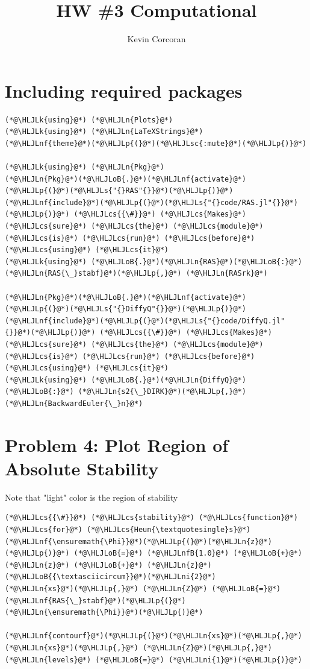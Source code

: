 \documentclass[12pt,a4paper]{article}
\title{ HW \#3 Computational }
\author{ Kevin Corcoran }
\newcommand{\HLJLk}[1]{\textcolor[RGB]{148,91,176}{\textbf{#1}}}
\newcommand{\HLJLn}[1]{#1}
\newcommand{\HLJLnf}[1]{\textcolor[RGB]{66,102,213}{#1}}
\newcommand{\HLJLs}[1]{\textcolor[RGB]{201,61,57}{#1}}
\newcommand{\HLJLsc}[1]{\textcolor[RGB]{201,61,57}{#1}}
\newcommand{\HLJLnfB}[1]{\textcolor[RGB]{59,151,46}{#1}}
\newcommand{\HLJLni}[1]{\textcolor[RGB]{59,151,46}{#1}}
\newcommand{\HLJLoB}[1]{\textcolor[RGB]{102,102,102}{\textbf{#1}}}
\newcommand{\HLJLp}[1]{#1}
\newcommand{\HLJLcs}[1]{\textcolor[RGB]{153,153,119}{\textit{#1}}}
\begin{document}
\maketitle

\section{Including required packages}

\begin{lstlisting}
(*@\HLJLk{using}@*) (*@\HLJLn{Plots}@*)
(*@\HLJLk{using}@*) (*@\HLJLn{LaTeXStrings}@*)
(*@\HLJLnf{theme}@*)(*@\HLJLp{(}@*)(*@\HLJLsc{:mute}@*)(*@\HLJLp{)}@*)

(*@\HLJLk{using}@*) (*@\HLJLn{Pkg}@*)
(*@\HLJLn{Pkg}@*)(*@\HLJLoB{.}@*)(*@\HLJLnf{activate}@*)(*@\HLJLp{(}@*)(*@\HLJLs{"{}RAS"{}}@*)(*@\HLJLp{)}@*)
(*@\HLJLnf{include}@*)(*@\HLJLp{(}@*)(*@\HLJLs{"{}code/RAS.jl"{}}@*)(*@\HLJLp{)}@*) (*@\HLJLcs{{\#}}@*) (*@\HLJLcs{Makes}@*) (*@\HLJLcs{sure}@*) (*@\HLJLcs{the}@*) (*@\HLJLcs{module}@*) (*@\HLJLcs{is}@*) (*@\HLJLcs{run}@*) (*@\HLJLcs{before}@*) (*@\HLJLcs{using}@*) (*@\HLJLcs{it}@*)
(*@\HLJLk{using}@*) (*@\HLJLoB{.}@*)(*@\HLJLn{RAS}@*)(*@\HLJLoB{:}@*) (*@\HLJLn{RAS{\_}stabf}@*)(*@\HLJLp{,}@*) (*@\HLJLn{RASrk}@*)

(*@\HLJLn{Pkg}@*)(*@\HLJLoB{.}@*)(*@\HLJLnf{activate}@*)(*@\HLJLp{(}@*)(*@\HLJLs{"{}DiffyQ"{}}@*)(*@\HLJLp{)}@*)
(*@\HLJLnf{include}@*)(*@\HLJLp{(}@*)(*@\HLJLs{"{}code/DiffyQ.jl"{}}@*)(*@\HLJLp{)}@*) (*@\HLJLcs{{\#}}@*) (*@\HLJLcs{Makes}@*) (*@\HLJLcs{sure}@*) (*@\HLJLcs{the}@*) (*@\HLJLcs{module}@*) (*@\HLJLcs{is}@*) (*@\HLJLcs{run}@*) (*@\HLJLcs{before}@*) (*@\HLJLcs{using}@*) (*@\HLJLcs{it}@*)
(*@\HLJLk{using}@*) (*@\HLJLoB{.}@*)(*@\HLJLn{DiffyQ}@*)(*@\HLJLoB{:}@*) (*@\HLJLn{s2{\_}DIRK}@*)(*@\HLJLp{,}@*) (*@\HLJLn{BackwardEuler{\_}n}@*)
\end{lstlisting}


\section{Problem 4: Plot Region of Absolute Stability}
Note that "light" color is the region of stability


\begin{lstlisting}
(*@\HLJLcs{{\#}}@*) (*@\HLJLcs{stability}@*) (*@\HLJLcs{function}@*) (*@\HLJLcs{for}@*) (*@\HLJLcs{Heun{\textquotesingle}s}@*)
(*@\HLJLnf{\ensuremath{\Phi}}@*)(*@\HLJLp{(}@*)(*@\HLJLn{z}@*)(*@\HLJLp{)}@*) (*@\HLJLoB{=}@*) (*@\HLJLnfB{1.0}@*) (*@\HLJLoB{+}@*) (*@\HLJLn{z}@*) (*@\HLJLoB{+}@*) (*@\HLJLn{z}@*)(*@\HLJLoB{{\textasciicircum}}@*)(*@\HLJLni{2}@*)
(*@\HLJLn{xs}@*)(*@\HLJLp{,}@*) (*@\HLJLn{Z}@*) (*@\HLJLoB{=}@*) (*@\HLJLnf{RAS{\_}stabf}@*)(*@\HLJLp{(}@*)(*@\HLJLn{\ensuremath{\Phi}}@*)(*@\HLJLp{)}@*)

(*@\HLJLnf{contourf}@*)(*@\HLJLp{(}@*)(*@\HLJLn{xs}@*)(*@\HLJLp{,}@*) (*@\HLJLn{xs}@*)(*@\HLJLp{,}@*) (*@\HLJLn{Z}@*)(*@\HLJLp{,}@*) (*@\HLJLn{levels}@*) (*@\HLJLoB{=}@*) (*@\HLJLni{1}@*)(*@\HLJLp{)}@*)
\end{lstlisting}
\end{document}
